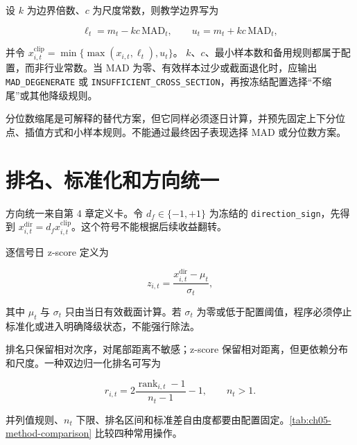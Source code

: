 设 \(k\) 为边界倍数、\(c\) 为尺度常数，则教学边界写为

\begin{equation}
  \ell_t=m_t-kc\,\mathrm{MAD}_t,
  \qquad
  u_t=m_t+kc\,\mathrm{MAD}_t,
  \label{eq:ch05-mad-bounds}
\end{equation}

并令
\(x^{\mathrm{clip}}_{i,t}=\min\{\max(x_{i,t},\ell_t),u_t\}\)。
\(k\)、\(c\)、最小样本数和备用规则都属于配置，而非行业常数。当 MAD 为零、有效样本过少或截面退化时，应输出
\texttt{MAD\_DEGENERATE} 或
\texttt{INSUFFICIENT\_CROSS\_SECTION}，再按冻结配置选择“不缩尾”或其他降级规则。

分位数缩尾是可解释的替代方案，但它同样必须逐日计算，并预先固定上下分位点、插值方式和小样本规则。不能通过最终因子表现选择 MAD 或分位数方案。

\section{排名、标准化和方向统一}

方向统一来自第 4 章定义卡。令 \(d_f\in\{-1,+1\}\) 为冻结的
\texttt{direction\_sign}，先得到
\(x^{\mathrm{dir}}_{i,t}=d_f x^{\mathrm{clip}}_{i,t}\)。这个符号不能根据后续收益翻转。

逐信号日 z-score 定义为

\begin{equation}
  z_{i,t}
  =
  \frac{
    x^{\mathrm{dir}}_{i,t}-\mu_t
  }{
    \sigma_t
  },
  \label{eq:ch05-zscore}
\end{equation}

其中 \(\mu_t\) 与 \(\sigma_t\) 只由当日有效截面计算。若
\(\sigma_t\) 为零或低于配置阈值，程序必须停止标准化或进入明确降级状态，不能强行除法。

排名只保留相对次序，对尾部距离不敏感；z-score 保留相对距离，但更依赖分布和尺度。一种双边归一化排名可写为

\begin{equation}
  r_{i,t}
  =
  2\frac{\operatorname{rank}_{i,t}-1}{n_t-1}-1,
  \qquad n_t>1.
  \label{eq:ch05-rank}
\end{equation}

并列值规则、\(n_t\) 下限、排名区间和标准差自由度都要由配置固定。\cref{tab:ch05-method-comparison} 比较四种常用操作。

